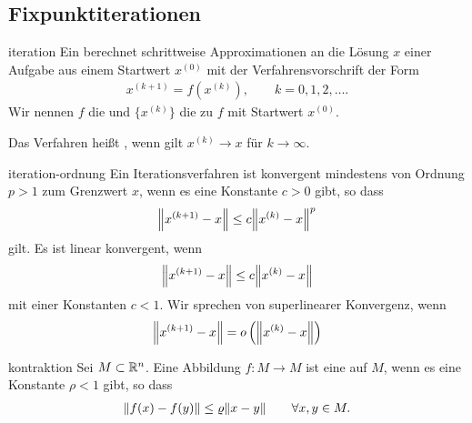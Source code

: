 \subsection{Fixpunktiterationen}
\begin{Definition}{iteration}
  Ein  berechnet schrittweise
  Approximationen an die Lösung $x$ einer Aufgabe aus einem Startwert
  $x^{(0)}$ mit der Verfahrensvorschrift der Form
  \begin{gather}
    x^{(k+1)} = f(x^{(k)}), \qquad k=0,1,2,\dots.
  \end{gather}
  Wir nennen $f$ die  und $\{x^{(k)}\}$ die
   zu $f$ mit Startwert $x^{(0)}$.
  
  Das Verfahren heißt , wenn gilt $x^{(k)} \to x$
  für $k\to\infty$.
\end{Definition}

\begin{Definition}{iteration-ordnung}
  Ein Iterationsverfahren
   ist konvergent
  mindestens von Ordnung $p>1$ zum Grenzwert $x$, wenn es eine
  Konstante $c>0$ gibt, so dass
  \begin{gather}
    \norm*{x^{(k+1)} - x} \le  c \norm*{x^{(k)} - x}^p
  \end{gather}
  gilt. Es ist linear konvergent, wenn
  \begin{gather}
    \norm*{x^{(k+1)} - x} \le  c \norm*{x^{(k)} - x}
  \end{gather}
  mit einer Konstanten $c<1$. Wir sprechen von superlinearer Konvergenz, wenn
  \begin{gather}
    \norm*{x^{(k+1)} - x} = \smallo\left(\norm*{x^{(k)} - x}\right)
  \end{gather}
\end{Definition}

\begin{Definition}{kontraktion}
  Sei $M\subset\R^n$. Eine Abbildung $f\colon M\to M$ ist eine  auf $M$, wenn es eine Konstante $\rho < 1$ gibt, so dass
  \begin{gather}
    \norm{f(x) - f(y)} \le \rho \norm{x-y} \qquad\forall x,y\in M.
  \end{gather}
\end{Definition}

